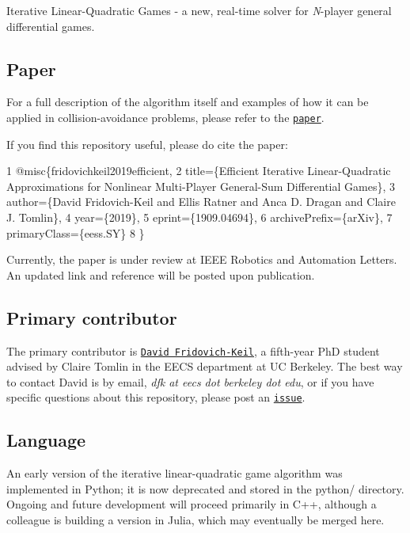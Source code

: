  

Iterative Linear-\/\+Quadratic Games -\/ a new, real-\/time solver for {\itshape N}-\/player general differential games.

\subsection*{Paper}

For a full description of the algorithm itself and examples of how it can be applied in collision-\/avoidance problems, please refer to the \href{https://arxiv.org/abs/1909.04694}{\tt paper}.

If you find this repository useful, please do cite the paper\+: 
\begin{DoxyCode}
1 @misc\{fridovichkeil2019efficient,
2     title=\{Efficient Iterative Linear-Quadratic Approximations for Nonlinear Multi-Player General-Sum
       Differential Games\},
3     author=\{David Fridovich-Keil and Ellis Ratner and Anca D. Dragan and Claire J. Tomlin\},
4     year=\{2019\},
5     eprint=\{1909.04694\},
6     archivePrefix=\{arXiv\},
7     primaryClass=\{eess.SY\}
8 \}
\end{DoxyCode}


Currently, the paper is under review at I\+E\+EE Robotics and Automation Letters. An updated link and reference will be posted upon publication.

\subsection*{Primary contributor}

The primary contributor is \href{https://people.eecs.berkeley.edu/~dfk/}{\tt David Fridovich-\/\+Keil}, a fifth-\/year PhD student advised by Claire Tomlin in the E\+E\+CS department at UC Berkeley. The best way to contact David is by email, {\itshape dfk at eecs dot berkeley dot edu}, or if you have specific questions about this repository, please post an \href{https://github.com/HJReachability/ilqgames/issues}{\tt issue}.

\subsection*{Language}

An early version of the iterative linear-\/quadratic game algorithm was implemented in Python; it is now deprecated and stored in the {\ttfamily python/} directory. Ongoing and future development will proceed primarily in C++, although a colleague is building a version in Julia, which may eventually be merged here.


